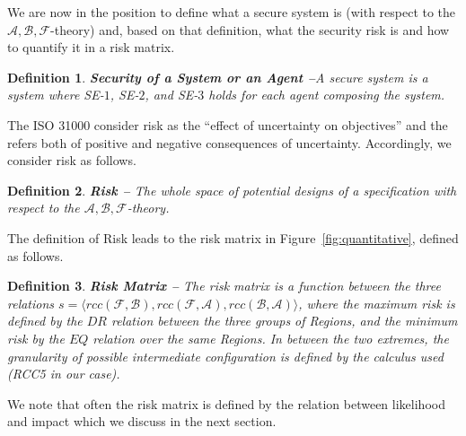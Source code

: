 \documentclass[conference]{IEEEtran}
\newcommand{\assertionRegion}{\mathcal{A}}
\newcommand{\beliefRegion}{\mathcal{B}}
\newcommand{\factRegion}{\mathcal{F}}
\newcommand{\rcc}{rcc}
\newcommand{\abf}{\assertionRegion,\beliefRegion,\factRegion}
\newtheorem{definition}{Definition}%
\begin{document}
We are now in the position to define what a secure system is (with respect to
the $\abf$-theory) and, based on that definition, what the security risk is and
how to quantify it in a risk matrix.
\begin{definition}{\bf Security of a System or an Agent --}\label{def:security}
	A secure system is a system where SE-$1$, SE-$2$, and SE-$3$ holds for
	each agent composing the system.
\end{definition}
The ISO 31000 consider risk as the ``effect of uncertainty on objectives'' and
the refers both of positive and negative consequences of uncertainty.
Accordingly, we consider risk as follows. 
\begin{definition}{\bf Risk --}
The whole space of potential designs of a specification with respect to the
	$\abf$-theory.
\end{definition}
The definition of Risk leads to the risk matrix in
Figure~\ref{fig:quantitative}, defined as follows.
\begin{definition}{\bf Risk Matrix --}
	The risk matrix is a function between the three relations
	$s=\langle\rcc(\factRegion,\beliefRegion),\rcc(\factRegion,\assertionRegion),\rcc(\beliefRegion,\assertionRegion)\rangle$,
	where the maximum risk is defined by the $DR$ relation between the
	three groups of Regions, and the minimum risk by the $EQ$ relation over
	the same Regions. In between the two extremes, the granularity of
	possible intermediate configuration is defined by the calculus used
	(RCC5 in our case).
\end{definition}
We note that often the risk matrix is defined by the relation between
likelihood and impact which we discuss in the next section.
\end{document}

